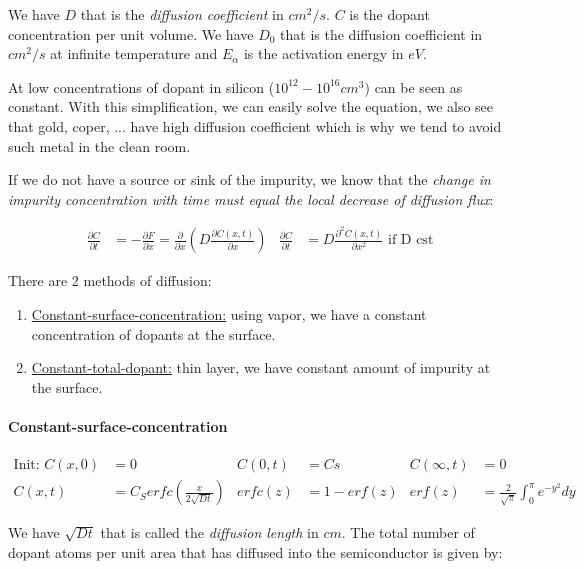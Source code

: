 \documentclass[
]{article}
\begin{document}
We have \(D\) that is the \emph{diffusion coefficient} in \(cm^2/s\).
\(C\) is the dopant concentration per unit volume. We have \(D_0\) that
is the diffusion coefficient in \(cm^2/s\) at infinite temperature and
\(E_\alpha\) is the activation energy in \(eV\).

At low concentrations of dopant in silicon (\(10^{12} - 10^{16} cm^3\))
can be seen as constant. With this simplification, we can easily solve
the equation, we also see that gold, coper, ... have high diffusion
coefficient which is why we tend to avoid such metal in the clean room.

If we do not have a source or sink of the impurity, we know that the
\emph{change in impurity concentration with time must equal the local
decrease of diffusion flux}:

\[\begin{aligned}
    \frac{\partial C}{\partial t} &= - \frac{\partial F}{\partial x} = \frac{\partial}{\partial x} \left( D\frac{\partial C(x,t)}{\partial x} \right) & \frac{\partial C}{\partial t} &=  D\frac{\partial^2 C(x,t)}{\partial x^2} \text{ if D cst}
\end{aligned}\]

There are 2 methods of diffusion:

\begin{enumerate}
\def\labelenumi{\arabic{enumi}.}
\item
  \ul{Constant-surface-concentration:} using vapor, we have a constant
  concentration of dopants at the surface.
\item
  \ul{Constant-total-dopant:} thin layer, we have constant amount of
  impurity at the surface.
\end{enumerate}

\hypertarget{constant-surface-concentration}{%
\paragraph{Constant-surface-concentration}\label{constant-surface-concentration}}

\[\begin{aligned}
    \text{Init: } C(x,0) &= 0 & C(0,t) &= Cs & C(\infty, t) &=0\\
    C(x,t) &= C_S erfc\left( \frac{x}{2\sqrt{Dt}} \right) & erfc(z) &= 1-erf(z) & erf(z)&=\frac{2}{\sqrt{\pi}}\int_0^\pi e^{-y^2} dy
\end{aligned}\]

We have \(\sqrt{Dt}\) that is called the \emph{diffusion length} in
\(cm\). The total number of dopant atoms per unit area that has diffused
into the semiconductor is given by:
\end{document}
